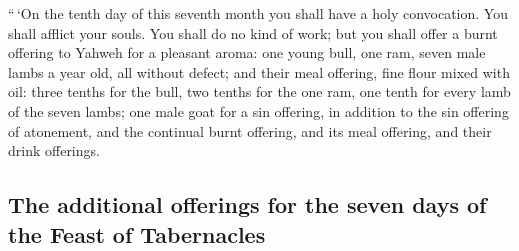\begin{paracol}{2}
\begin{otherlanguage}{english}
 ``\,`On the tenth day of this seventh month you shall
have a holy convocation. You shall afflict your souls. You shall do no
kind of work;  but you shall offer a burnt offering to
Yahweh for a pleasant aroma: one young bull, one ram, seven male lambs a
year old, all without defect;  and their meal offering,
fine flour mixed with oil: three tenths for the bull, two tenths for the
one ram,  one tenth for every lamb of the seven lambs;
 one male goat for a sin offering, in addition to the sin
offering of atonement, and the continual burnt offering, and its meal
offering, and their drink offerings.

\hypertarget{the-additional-offerings-for-the-seven-days-of-the-feast-of-tabernacles}{%
\subsection{The additional offerings for the seven days of the Feast of
Tabernacles}\label{the-additional-offerings-for-the-seven-days-of-the-feast-of-tabernacles}}


\end{otherlanguage}
\end{paracol}
